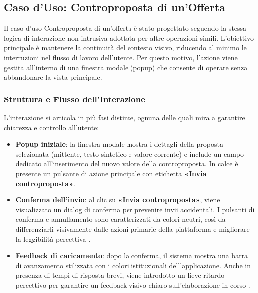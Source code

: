 \subsection{Caso d'Uso: Controproposta di un'Offerta}

Il caso d’uso Controproposta di un’offerta è stato progettato seguendo la stessa logica di interazione non intrusiva adottata per altre operazioni simili.
L’obiettivo principale è mantenere la continuità del contesto visivo, riducendo al minimo le interruzioni nel flusso di lavoro dell’utente. Per questo motivo, l’azione viene gestita all’interno di una finestra modale (popup) che consente di operare senza abbandonare la vista principale.

\vspace{0.5cm}
\subsubsection{Struttura e Flusso dell’Interazione}
L’interazione si articola in più fasi distinte, ognuna delle quali mira a garantire chiarezza e controllo all’utente:
\begin{itemize}
	\item \textbf{Popup iniziale}: la finestra modale mostra i dettagli della proposta selezionata (mittente, testo sintetico e valore corrente) e include un campo dedicato all’inserimento del nuovo valore della controproposta.
	In calce è presente un pulsante di azione principale con etichetta \textbf{«Invia controproposta»}.
	
	\item \textbf{Conferma dell’invio}: al clic su \textbf{«Invia controproposta»}, viene visualizzato un dialog di conferma per prevenire invii accidentali.  
	I pulsanti di conferma e annullamento sono caratterizzati da colori neutri, così da differenziarli visivamente dalle azioni primarie della piattaforma e migliorare la leggibilità percettiva \cite{nielsen1995}.
	
	\item \textbf{Feedback di caricamento}: dopo la conferma, il sistema mostra una barra di avanzamento stilizzata con i colori istituzionali dell’applicazione.  
	Anche in presenza di tempi di risposta brevi, viene introdotto un lieve ritardo percettivo per garantire un feedback visivo chiaro sull’elaborazione in corso \cite{shneiderman2004}.
	
	
\end{itemize}

\vspace{0.5cm}
